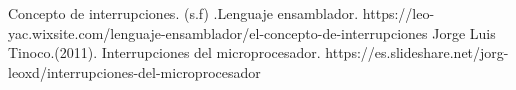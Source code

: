 \documentclass{report}   %
\begin{document}
\begin{thebibliography}{0}
  Concepto de interrupciones. (s.f) .Lenguaje ensamblador.
  https://leo-yac.wixsite.com/lenguaje-ensamblador/el-concepto-de-interrupciones
   Jorge Luis Tinoco.(2011). Interrupciones del microprocesador. https://es.slideshare.net/jorg-leoxd/interrupciones-del-microprocesador

\end{thebibliography}
\end{document}
